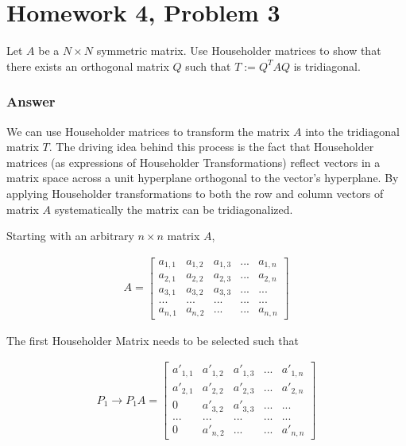 \documentclass{article}
\newcommand{\n}{\newline}
\begin{document}
	\section{Homework 4, Problem 3}
	Let $A$ be a $N\times N$ symmetric matrix.  Use Householder matrices to show that there exists an orthogonal matrix $Q$ such that $T:=Q^{T}AQ$ is tridiagonal.
	
		\subsubsection{Answer}	
		
		We can use Householder matrices to transform the matrix $A$ into the tridiagonal matrix $T$.  The driving idea behind this process is the fact that Householder matrices (as expressions of Householder Transformations) reflect vectors in a matrix space across a unit hyperplane orthogonal to the vector's hyperplane.  By applying Householder transformations to both the row and column vectors of matrix $A$ systematically the matrix can be tridiagonalized.  \n
		
		Starting with an arbitrary $n\times n$ matrix $A$,
		
		\begin{align*}
			A=
			\begin{bmatrix}
			a_{1,1} & a_{1,2} & a_{1,3} & ... & a_{1,n}\\
			a_{2,1} & a_{2,2} & a_{2,3} & ... & a_{2,n} \\
			a_{3,1} & a_{3,2} & a_{3,3} & ... & ... \\
			... & ... & ... & ... & ...\\
			a_{n,1} & a_{n,2} & ... & ... & a_{n,n}
			\end{bmatrix}
		\end{align*}
		
		The first Householder Matrix needs to be selected such that 
		
		\begin{align*}
			P_{1}\rightarrow P_{1}A=
			\begin{bmatrix}
			a'_{1,1} & a'_{1,2} & a'_{1,3} & ... & a'_{1,n}\\
			a'_{2,1} & a'_{2,2} & a'_{2,3} & ... & a'_{2,n} \\
			0 & a'_{3,2} & a'_{3,3} & ... & ... \\
			... & ... & ... & ... & ...\\
			0 & a'_{n,2} & ... & ... & a'_{n,n}
			\end{bmatrix}
		\end{align*}
		
\end{document}
